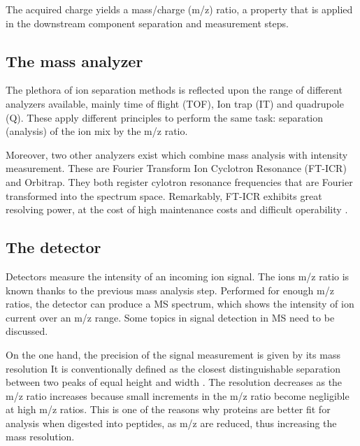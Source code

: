\documentclass[thesis]{subfiles}
\begin{document}
The acquired charge yields a mass/charge (\ac{m/z}) ratio, a property that is applied in the downstream component separation and measurement steps.

\subsection{The mass analyzer}
\label{subsec:the_mass_analyzer}

The plethora of ion separation methods is reflected upon the range of different analyzers available, mainly time of flight (\ac{TOF}), Ion trap (\ac{IT}) and quadrupole (\ac{Q}). These apply different principles to perform the same task: separation (analysis) of the ion mix by the \ac{m/z} ratio.

Moreover, two other analyzers exist which combine mass analysis with intensity measurement. These are Fourier Transform Ion Cyclotron Resonance (\ac{FT-ICR}) and Orbitrap. They both register cylotron resonance frequencies that are Fourier transformed into the spectrum space. Remarkably, \ac{FT-ICR} exhibits great resolving power, at the cost of high maintenance costs and difficult operability \cite{Barsnes2008}. 

\subsection{The detector}
\label{subsec:the_detector}

Detectors measure the intensity of an incoming ion signal. The ion\textquotesingle s \ac{m/z} ratio is known thanks to the previous mass analysis step. Performed for enough \ac{m/z} ratios, the detector can produce a \ac{MS} spectrum, which shows the intensity of ion current over an \ac{m/z} range. Some topics in signal detection in \ac{MS} need to be discussed.

On the one hand, the precision of the signal measurement is given by its mass resolution It is conventionally defined as the closest distinguishable separation between two peaks of equal height and width \cite{Marshall2013}. The resolution decreases as the \ac{m/z} ratio increases because small increments in the \ac{m/z} ratio become negligible at high \ac{m/z} ratios. This is one of the reasons why proteins are better fit for analysis when digested into peptides, as \ac{m/z} are reduced, thus increasing the mass resolution.
\end{document}
